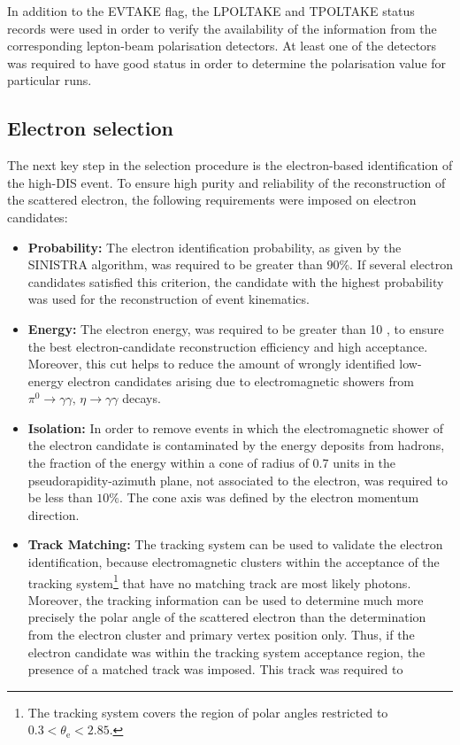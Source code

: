 In addition to the EVTAKE flag, the LPOLTAKE and TPOLTAKE status records were used in order to verify the availability of the information from the corresponding lepton-beam polarisation detectors. At least one of the detectors was required to have good status in order to determine the polarisation value for particular runs.

\subsection{Electron selection}
\label{subsec:eleselect}
The next key step in the selection procedure is the electron-based identification of the high-\qsq DIS event. To ensure high purity and reliability of the reconstruction of the scattered electron, the following requirements were imposed on electron candidates:
\begin{itemize}
	\item \textbf{Probability:} The electron identification probability, as given by the SINISTRA algorithm, was required to be greater than $90\%$. If several electron candidates satisfied this criterion, the candidate with the highest probability was used for the reconstruction of event kinematics.
	\item \textbf{Energy:} The electron energy, \eefin was required to be greater than 10 \GeV, to ensure the best electron-candidate reconstruction efficiency and high acceptance. Moreover, this cut helps to reduce the amount of wrongly identified low-energy electron candidates arising due to electromagnetic showers from $\pi^0\rightarrow\gamma\gamma,\, \eta\rightarrow\gamma\gamma$ decays.
	\item \textbf{Isolation:} In order to remove events in which the electromagnetic shower of the electron candidate is contaminated by the energy deposits from hadrons, the fraction of the energy within a cone of radius of 0.7 units in the pseudorapidity-azimuth plane, not associated to the electron, was required to be less than $10\%$. The cone axis was defined by the electron momentum direction.
	\item \textbf{Track Matching:} The tracking system can be used to validate the electron identification, because electromagnetic clusters within the acceptance of the tracking system\footnote{The tracking system covers the region of polar angles restricted to $0.3 < \theta_\text{e} < 2.85$.} that have no matching track are most likely photons. Moreover, the tracking information can be used to determine much more precisely the polar angle of the scattered electron than the determination from the electron cluster and primary vertex position only. Thus, if the electron candidate was within the tracking system acceptance region, the presence of a matched track was imposed. This track was required to 

\end{itemize}
